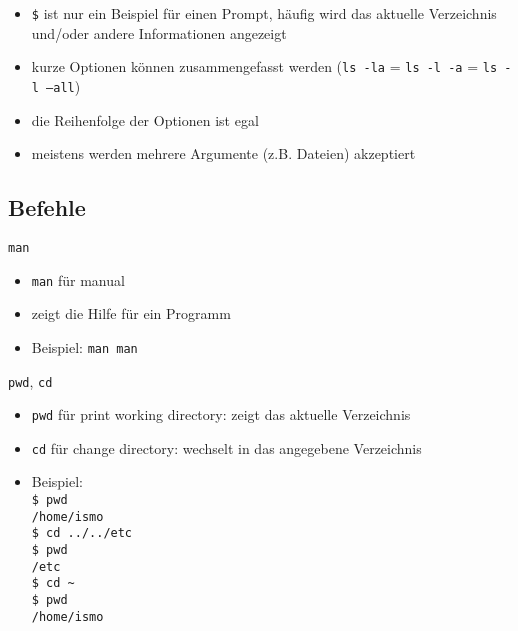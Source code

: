       \begin{frame}
        \begin{itemize}
          \item \texttt{\$} ist nur ein Beispiel für einen Prompt, häufig wird das aktuelle Verzeichnis und/oder andere Informationen angezeigt
          \item kurze Optionen können zusammengefasst werden (\texttt{ls~-la} = \texttt{ls -l -a} = \texttt{ls -l --all})
          \item die Reihenfolge der Optionen ist egal
          \item meistens werden mehrere Argumente (z.B. Dateien) akzeptiert
        \end{itemize}
      \end{frame}

    \subsection{Befehle}
      \begin{frame}{\texttt{man}}
        \begin{itemize}
          \item \texttt{man} für manual
          \item zeigt die Hilfe für ein Programm
          \item Beispiel: \texttt{man man}
        \end{itemize}
      \end{frame}

      \begin{frame}{\texttt{pwd}, \texttt{cd}}
        \begin{itemize}
          \item \texttt{pwd} für print working directory: zeigt das aktuelle Verzeichnis
          \item \texttt{cd} für change directory: wechselt in das angegebene Verzeichnis
          \item Beispiel:\\
            \texttt{\$ pwd\\
                    /home/ismo\\
                    \$ cd ../../etc\\
                    \$ pwd\\
                    /etc\\
                    \$ cd \textasciitilde\\
                    \$ pwd\\
                    /home/ismo}
        \end{itemize}
      \end{frame}

